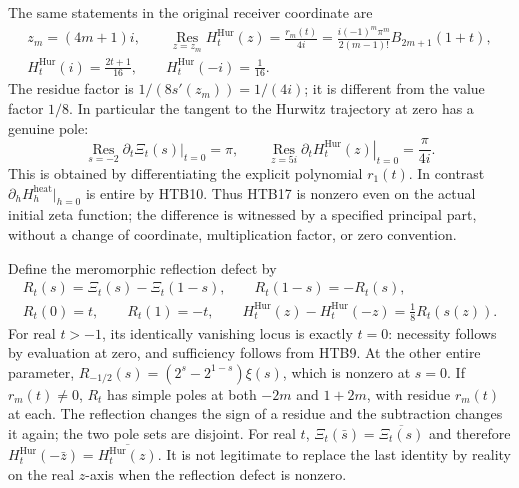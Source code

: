 The same statements in the original receiver coordinate are
\begin{equation}\tag{HTB20}
\begin{gathered}
 z_m=(4m+1)i,\qquad
 \operatorname*{Res}_{z=z_m}H_t^{\mathrm{Hur}}(z)
 =\frac{r_m(t)}{4i}
 =\frac{i(-1)^m\pi^m}{2(m-1)!}B_{2m+1}(1+t),\\
 H_t^{\mathrm{Hur}}(i)=\frac{2t+1}{16},\qquad
 H_t^{\mathrm{Hur}}(-i)=\frac1{16}.
\end{gathered}
\end{equation}
The residue factor is $1/(8s'(z_m))=1/(4i)$; it is different from
the value factor $1/8$. In particular the tangent to the Hurwitz
trajectory at zero has a genuine pole:
\begin{equation}\tag{HTB21}
 \operatorname*{Res}_{s=-2}\left.\partial_t\Xi_t(s)\right|_{t=0}
 =\pi,\qquad
 \operatorname*{Res}_{z=5i}\left.\partial_tH_t^{\mathrm{Hur}}(z)
                                      \right|_{t=0}=\frac{\pi}{4i}.
\end{equation}
This is obtained by differentiating the explicit polynomial $r_1(t)$.
In contrast $\partial_h H_h^{\mathrm{heat}}|_{h=0}$ is entire by
HTB10. Thus HTB17 is nonzero even on the actual initial zeta function;
the difference is witnessed by a specified principal part, without a
change of coordinate, multiplication factor, or zero convention.

Define the meromorphic reflection defect by
\begin{equation}\tag{HTB22}
\begin{gathered}
 R_t(s)=\Xi_t(s)-\Xi_t(1-s),\qquad R_t(1-s)=-R_t(s),\\
 R_t(0)=t,\qquad R_t(1)=-t,\qquad
 H_t^{\mathrm{Hur}}(z)-H_t^{\mathrm{Hur}}(-z)=\frac18R_t(s(z)).
\end{gathered}
\end{equation}
For real $t>-1$, its identically vanishing locus is exactly $t=0$:
necessity follows by evaluation at zero, and sufficiency follows from
HTB9. At the other entire parameter,
$R_{-1/2}(s)=(2^s-2^{1-s})\xi(s)$, which is nonzero at $s=0$.
If $r_m(t)\ne0$, $R_t$ has simple poles at both $-2m$ and $1+2m$,
with residue $r_m(t)$ at each. The reflection changes the sign of a
residue and the subtraction changes it again; the two pole sets are
disjoint. For real $t$, $\Xi_t(\bar s)=\overline{\Xi_t(s)}$ and
therefore
$H_t^{\mathrm{Hur}}(-\bar z)=\overline{H_t^{\mathrm{Hur}}(z)}$.
It is not legitimate to replace the last identity by reality on the
real $z$-axis when the reflection defect is nonzero.


